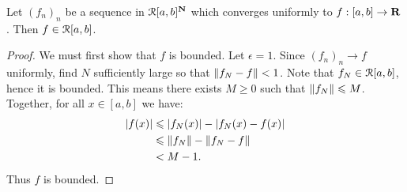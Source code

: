 \documentclass[11pt,twoside,openany]{memoir}
\begin{document}
    \begin{proposition}
        Let $(f_n)_n$ be a sequence in $\mathcal{R}[a,b]^{\mathbf{N}}$ which converges uniformly to $f:[a,b] \rightarrow \mathbf{R}$. Then $f \in \mathcal{R}[a,b]$.
    \end{proposition}
        \begin{proof}
            We must first show that $f$ is bounded. Let $\epsilon = 1$. Since $(f_n)_n \rightarrow f$ uniformly, find $N$ sufficiently large so that $\left\lVert f_N - f \right\rVert < 1$. Note that $f_N \in \mathcal{R}[a,b]$, hence it is bounded. This means there exists $M \geq 0$ such that $\left\lVert f_N \right\rVert \leqslant M$. Together, for all $x \in [a,b]$ we have:
                \begin{equation*}
                \begin{split}
                    |f(x)| 
                    &\leqslant |f_N(x)| - |f_N(x) - f(x)| \\
                    & \leqslant \left\lVert f_N \right\rVert - \left\lVert f_N - f \right\rVert \\
                    & < M - 1.
                \end{split}
                \end{equation*}
            Thus $f$ is bounded.


\end{proof}
\end{document}
